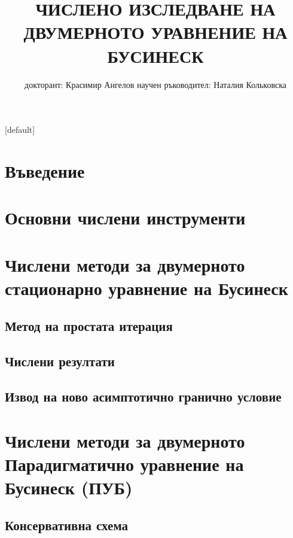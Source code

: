 \documentclass{beamer}
\begin{document}
\title{ЧИСЛЕНО ИЗСЛЕДВАНЕ НА\\ ДВУМЕРНОТО УРАВНЕНИЕ НА БУСИНЕСК}
\author{докторант: Красимир Ангелов 
\newline \newline научен ръководител: Наталия Кольковска}


\begin{frame}
\titlepage
\end{frame}

\begin{frame}
\tableofcontents 
{}[default]
\section{Въведение}
\section{Основни числени инструменти}
\section{Числени методи за двумерното стационарно уравнение на Бусинеск}
\subsection{Метод на простата итерация}
\subsection{Числени резултати}
\subsection{Извод на ново асимптотично гранично условие}
\section{Числени методи за двумерното Парадигматично уравнение на Бусинеск (ПУБ)}
\subsection{Консервативна схема}

\end{frame}
\end{document}
